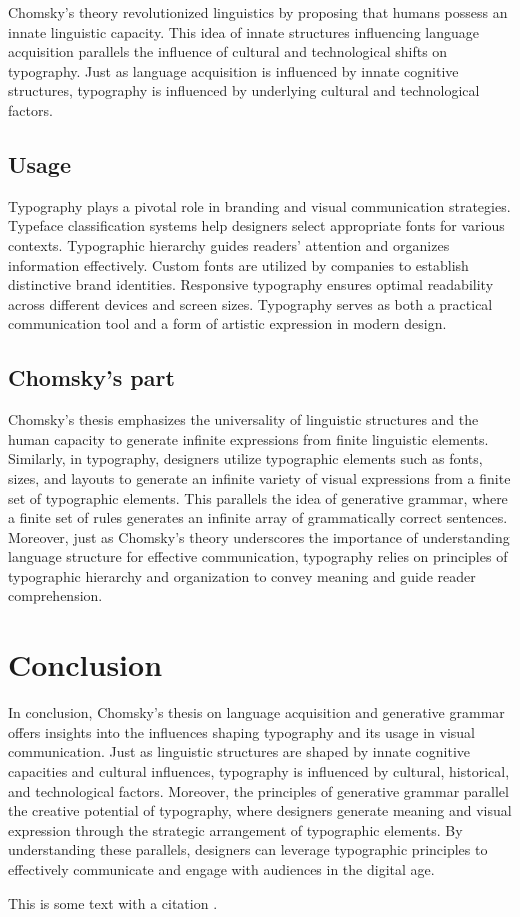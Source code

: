 \documentclass[11pt]{article}
\begin{document}
    Chomsky's theory revolutionized linguistics by proposing that humans possess an innate linguistic
    capacity. This idea of innate structures influencing language acquisition parallels the influence
    of cultural and technological shifts on typography. Just as language acquisition is influenced by
    innate cognitive structures, typography is influenced by underlying cultural and technological factors.

    \subsection{Usage}
    Typography plays a pivotal role in branding and visual communication strategies.
    Typeface classification systems help designers select appropriate fonts for various contexts.
    Typographic hierarchy guides readers' attention and organizes information effectively.
    Custom fonts are utilized by companies to establish distinctive brand identities.
    Responsive typography ensures optimal readability across different devices and screen sizes.
    Typography serves as both a practical communication tool and a form of artistic expression in modern design.
    \subsection{Chomsky's part}
    Chomsky's thesis emphasizes the universality of linguistic structures and the human capacity to generate
    infinite expressions from finite linguistic elements. Similarly, in typography, designers utilize typographic
    elements such as fonts, sizes, and layouts to generate an infinite variety of visual expressions from a finite
    set of typographic elements. This parallels the idea of generative grammar, where a finite set of rules generates
    an infinite array of grammatically correct sentences. Moreover, just as Chomsky's theory underscores the importance
    of understanding language structure for effective communication, typography relies on principles of typographic
    hierarchy and organization to convey meaning and guide reader comprehension.

    \section{Conclusion}
    In conclusion, Chomsky's thesis on language acquisition and generative grammar offers insights into the influences
    shaping typography and its usage in visual communication. Just as linguistic structures are shaped by innate
    cognitive capacities and cultural influences, typography is influenced by cultural, historical, and technological
    factors. Moreover, the principles of generative grammar parallel the creative potential of typography,
    where designers generate meaning and visual expression through the strategic arrangement of typographic elements.
    By understanding these parallels, designers can leverage typographic principles to effectively communicate
    and engage with audiences in the digital age.

    This is some text with a citation \cite{einstein1905}.

\end{document}
